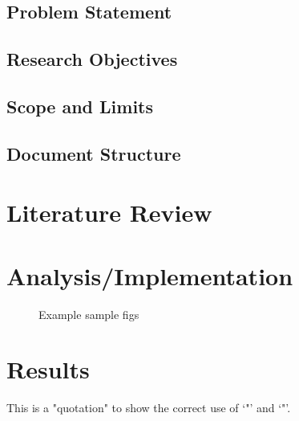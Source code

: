 \documentclass[]{nucthesis}
\begin{document}
\section{Problem Statement}
\section{Research Objectives}
\section{Scope and Limits}
\section{Document Structure}


\chapter{Literature Review}

\guidelit %

\chapter{Analysis/Implementation}
\guideanalysis  %

\guideimplementation  %

\begin{figure}[ht]%
    \centering
    \caption{Example sample figs}%
    \label{fig:samplefigs}%
\end{figure}

\chapter{Results}
\guideresults %

This is a "quotation" to show the correct use of `"' and `"'.
\end{document}
